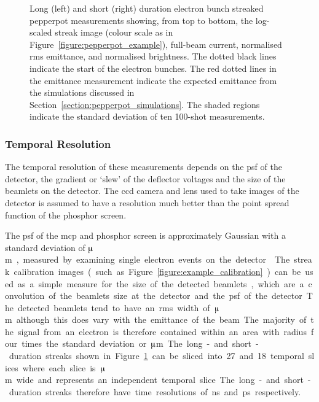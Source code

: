 \begin{figure}
    \center
    
    \caption[Streaked brightness measurements for $\muup$s and ns timescales.]{Long (left) and short (right) duration electron bunch streaked pepperpot measurements showing, from top to bottom, the log-scaled streak image (colour scale as in Figure~\ref{figure:pepperpot_example}), full-beam current, normalised \gls{rms} emittance, and normalised brightness. The dotted black lines indicate the start of the electron bunches. The red dotted lines in the emittance measurement indicate the expected emittance from the simulations discussed in Section~\ref{section:pepperpot_simulations}. The shaded regions indicate the standard deviation of ten 100-shot measurements.}
    \label{figure:streaks}
\end{figure}

\subsubsection{Temporal Resolution}
The temporal resolution of these measurements depends on the \gls{psf} of the detector, the gradient or `slew' of the deflector voltages and the size of the beamlets on the detector.
The \gls{ccd} camera and lens used to take images of the detector is assumed to have a resolution much better than the point spread function of the phosphor screen.

The \gls{psf} of the \gls{mcp} and phosphor screen is approximately Gaussian with a standard deviation of \unit[35]{$\muup$m}, measured by examining single electron events on the detector~\cite{speirs_electron_2017}.
The streak calibration images (such as Figure~\ref{figure:example_calibration}) can be used as a simple measure for the size of the detected beamlets, which are a convolution of the beamlets size at the detector and the \gls{psf} of the detector.
The detected beamlets tend to have an \gls{rms} width of \unit[200]{$\muup$m} although this does vary with the emittance of the beam.
The majority of the signal from an electron is therefore contained within an area with radius four times the standard deviation or \unit[800]{$\muup$m}.
The long- and short-duration streaks shown in Figure~\ref{figure:streaks} can be sliced into 27 and 18 temporal slices where each slice is \unit[800]{$\muup$m} wide and represents an independent temporal slice.
The long- and short-duration streaks therefore have time resolutions of \unit[524]{ns} and \unit[247]{ps} respectively.

